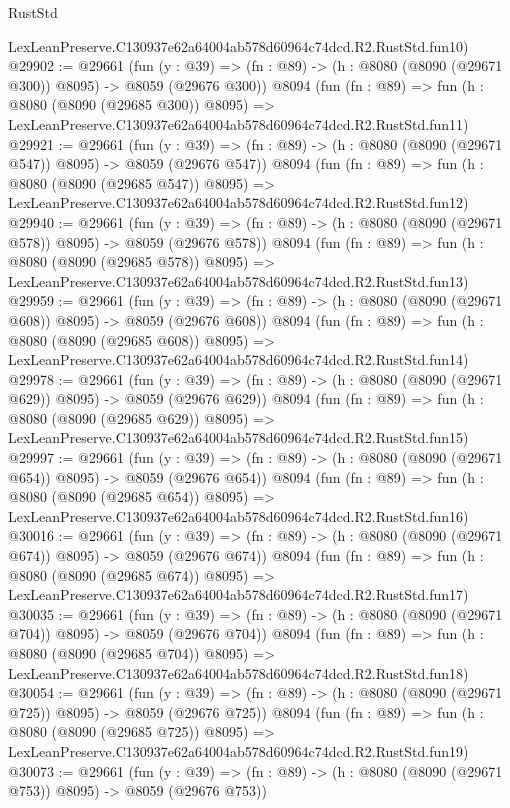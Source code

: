 \begin{lexlean}{RustStd}
\begin{coremodule}
    LexLeanPreserve.C130937e62a64004ab578d60964c74dcd.R2.RustStd.fun10)
@29902 := @29661
    (fun (y : @39) => (fn : @89) -> (h : @8080 (@8090 (@29671 @300)) @8095) -> @8059 (@29676 @300))
    @8094
    (fun (fn : @89) =>
    fun (h : @8080 (@8090 (@29685 @300)) @8095) =>
    LexLeanPreserve.C130937e62a64004ab578d60964c74dcd.R2.RustStd.fun11)
@29921 := @29661
    (fun (y : @39) => (fn : @89) -> (h : @8080 (@8090 (@29671 @547)) @8095) -> @8059 (@29676 @547))
    @8094
    (fun (fn : @89) =>
    fun (h : @8080 (@8090 (@29685 @547)) @8095) =>
    LexLeanPreserve.C130937e62a64004ab578d60964c74dcd.R2.RustStd.fun12)
@29940 := @29661
    (fun (y : @39) => (fn : @89) -> (h : @8080 (@8090 (@29671 @578)) @8095) -> @8059 (@29676 @578))
    @8094
    (fun (fn : @89) =>
    fun (h : @8080 (@8090 (@29685 @578)) @8095) =>
    LexLeanPreserve.C130937e62a64004ab578d60964c74dcd.R2.RustStd.fun13)
@29959 := @29661
    (fun (y : @39) => (fn : @89) -> (h : @8080 (@8090 (@29671 @608)) @8095) -> @8059 (@29676 @608))
    @8094
    (fun (fn : @89) =>
    fun (h : @8080 (@8090 (@29685 @608)) @8095) =>
    LexLeanPreserve.C130937e62a64004ab578d60964c74dcd.R2.RustStd.fun14)
@29978 := @29661
    (fun (y : @39) => (fn : @89) -> (h : @8080 (@8090 (@29671 @629)) @8095) -> @8059 (@29676 @629))
    @8094
    (fun (fn : @89) =>
    fun (h : @8080 (@8090 (@29685 @629)) @8095) =>
    LexLeanPreserve.C130937e62a64004ab578d60964c74dcd.R2.RustStd.fun15)
@29997 := @29661
    (fun (y : @39) => (fn : @89) -> (h : @8080 (@8090 (@29671 @654)) @8095) -> @8059 (@29676 @654))
    @8094
    (fun (fn : @89) =>
    fun (h : @8080 (@8090 (@29685 @654)) @8095) =>
    LexLeanPreserve.C130937e62a64004ab578d60964c74dcd.R2.RustStd.fun16)
@30016 := @29661
    (fun (y : @39) => (fn : @89) -> (h : @8080 (@8090 (@29671 @674)) @8095) -> @8059 (@29676 @674))
    @8094
    (fun (fn : @89) =>
    fun (h : @8080 (@8090 (@29685 @674)) @8095) =>
    LexLeanPreserve.C130937e62a64004ab578d60964c74dcd.R2.RustStd.fun17)
@30035 := @29661
    (fun (y : @39) => (fn : @89) -> (h : @8080 (@8090 (@29671 @704)) @8095) -> @8059 (@29676 @704))
    @8094
    (fun (fn : @89) =>
    fun (h : @8080 (@8090 (@29685 @704)) @8095) =>
    LexLeanPreserve.C130937e62a64004ab578d60964c74dcd.R2.RustStd.fun18)
@30054 := @29661
    (fun (y : @39) => (fn : @89) -> (h : @8080 (@8090 (@29671 @725)) @8095) -> @8059 (@29676 @725))
    @8094
    (fun (fn : @89) =>
    fun (h : @8080 (@8090 (@29685 @725)) @8095) =>
    LexLeanPreserve.C130937e62a64004ab578d60964c74dcd.R2.RustStd.fun19)
@30073 := @29661
    (fun (y : @39) => (fn : @89) -> (h : @8080 (@8090 (@29671 @753)) @8095) -> @8059 (@29676 @753))

\end{coremodule}
\end{lexlean}
